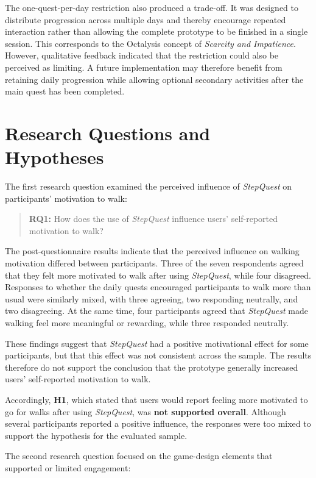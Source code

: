 The one-quest-per-day restriction also produced a trade-off. It was designed to distribute progression across multiple days and thereby encourage repeated interaction rather than allowing the complete prototype to be finished in a single session. This corresponds to the Octalysis concept of \textit{Scarcity and Impatience}. However, qualitative feedback indicated that the restriction could also be perceived as limiting. A future implementation may therefore benefit from retaining daily progression while allowing optional secondary activities after the main quest has been completed.


\section{Research Questions and Hypotheses}

The first research question examined the perceived influence of
\textit{StepQuest} on participants' motivation to walk:

\begin{quote}
	\textbf{RQ1:} How does the use of \textit{StepQuest} influence users'
	self-reported motivation to walk?
\end{quote}

The post-questionnaire results indicate that the perceived influence on
walking motivation differed between participants. Three of the seven
respondents agreed that they felt more motivated to walk after using
\textit{StepQuest}, while four disagreed. Responses to whether the daily
quests encouraged participants to walk more than usual were similarly
mixed, with three agreeing, two responding neutrally, and two disagreeing.
At the same time, four participants agreed that \textit{StepQuest} made
walking feel more meaningful or rewarding, while three responded neutrally.

These findings suggest that \textit{StepQuest} had a positive motivational
effect for some participants, but that this effect was not consistent
across the sample. The results therefore do not support the conclusion that
the prototype generally increased users' self-reported motivation to walk.

Accordingly, \textbf{H1}, which stated that users would report feeling more
motivated to go for walks after using \textit{StepQuest}, was
\textbf{not supported overall}. Although several participants reported a
positive influence, the responses were too mixed to support the hypothesis
for the evaluated sample.


The second research question focused on the game-design elements that
supported or limited engagement:

